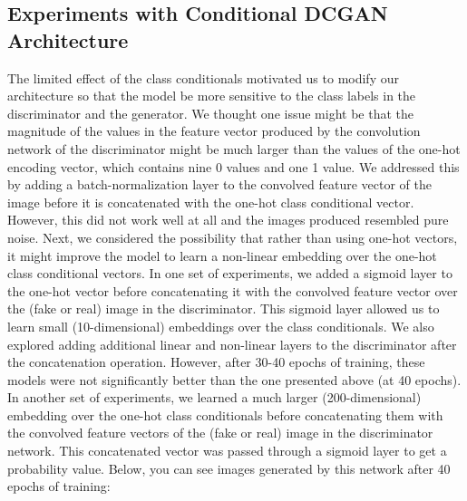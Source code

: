 \documentclass[a4paper]{article}
\begin{document}
\subsection*{Experiments with Conditional DCGAN Architecture}
The limited effect of the class conditionals motivated us to modify our architecture so that the model be more sensitive to the class labels in the discriminator and the generator. We thought one issue might be that the magnitude of the values in the feature vector produced by the convolution network of the discriminator might be much larger than the values of the one-hot encoding vector, which contains nine 0 values and one 1 value. We addressed this by adding a batch-normalization layer to the convolved feature vector of the image before it is concatenated with the one-hot class conditional vector. However, this did not work well at all and the images produced resembled pure noise.
\newline
\newline
Next, we considered the possibility that rather than using one-hot vectors, it might improve the model to learn a non-linear embedding over the one-hot class conditional vectors. In one set of experiments, we added a sigmoid layer to the one-hot vector before concatenating it with the convolved feature vector over the (fake or real) image in the discriminator. This sigmoid layer allowed us to learn small (10-dimensional) embeddings over the class conditionals. We also explored adding additional linear and non-linear layers to the discriminator after the concatenation operation. However, after 30-40 epochs of training, these models were not significantly better than the one presented above (at 40 epochs).
\newline
\newline
In another set of experiments, we learned a much larger (200-dimensional) embedding over the one-hot class conditionals before concatenating them with the convolved feature vectors of the (fake or real) image in the discriminator network. This concatenated vector was passed through a sigmoid layer to get a probability value. Below, you can see images generated by this network after 40 epochs of training:
\end{document}
